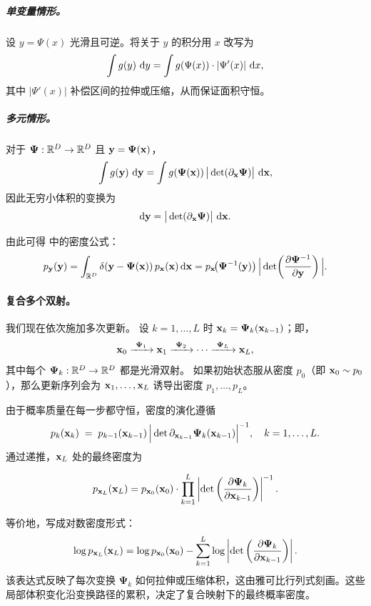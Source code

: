 \subparagraph{单变量情形。}
设 $y = \Psi(x)$ 光滑且可逆。将关于 $y$ 的积分用 $x$ 改写为
\[
\int g(y)\,\mathop{}\!\mathrm{d} y = \int g(\Psi(x)) \cdot |\Psi'(x)|\,\mathop{}\!\mathrm{d} x,
\]
其中 $|\Psi'(x)|$ 补偿区间的拉伸或压缩，从而保证面积守恒。

\subparagraph{多元情形。}
对于 $\bm{\Psi}: \mathbb{R}^D \to \mathbb{R}^D$ 且 ${\mathbf{y}}=\bm{\Psi}({\mathbf{x}})$，
\[
\int g({\mathbf{y}})\,\mathop{}\!\mathrm{d}{\mathbf{y}}
= \int g(\bm{\Psi}({\mathbf{x}})) \,\big|\det(\partial_{\mathbf{x}} \bm{\Psi})\big| \,\mathop{}\!\mathrm{d}{\mathbf{x}},
\]
因此无穷小体积的变换为
\[
\mathop{}\!\mathrm{d} {\mathbf{y}} = \big|\det(\partial_{\mathbf{x}} \bm{\Psi})\big|\,\mathop{}\!\mathrm{d} {\mathbf{x}}.
\]

由此可得  中的密度公式：
\begin{align*}
p_{{\mathbf{y}}}({\mathbf{y}})
= \int_{\mathbb{R}^D} \delta({\mathbf{y}} - \bm{\Psi}({\mathbf{x}}))\, p_{{\mathbf{x}}}({\mathbf{x}})\mathop{}\!\mathrm{d} {\mathbf{x}} = p_{{\mathbf{x}}}\!\big(\bm{\Psi}^{-1}({\mathbf{y}})\big)\,\Big|\det\!\left(\frac{\partial \bm{\Psi}^{-1}}{\partial {\mathbf{y}}}\right)\Big|.
\end{align*}



\paragraph{复合多个双射。} 我们现在依次施加多次更新。  
设 $k=1,\dots,L$ 时 ${\mathbf{x}}_k = \bm{\Psi}_k({\mathbf{x}}_{k-1})$；即，
\[
{\mathbf{x}}_0 \xrightarrow{\ \bm{\Psi}_1\ } {\mathbf{x}}_1 \xrightarrow{\ \bm{\Psi}_2\ } \cdots
\xrightarrow{\ \bm{\Psi}_L\ } {\mathbf{x}}_L,
\]
其中每个 $\bm{\Psi}_k:\mathbb{R}^D \to \mathbb{R}^D$ 都是光滑双射。  
如果初始状态服从密度 $p_0$（即 ${\mathbf{x}}_0 \sim p_0$），那么更新序列会为 ${\mathbf{x}}_1,\dots,{\mathbf{x}}_L$ 诱导出密度 $p_1,\dots,p_L$。  

由于概率质量在每一步都守恒，密度的演化遵循
\[
p_{k}({\mathbf{x}}_k) \;=\; p_{k-1}({\mathbf{x}}_{k-1}) \,
   \Big|\det \partial_{{\mathbf{x}}_{k-1}} \bm{\Psi}_k({\mathbf{x}}_{k-1})\Big|^{-1},
   \quad k=1,\dots,L.
\]
通过递推，${\mathbf{x}}_L$ 处的最终密度为
\begin{mdframed}
\begin{align}\label{eq:cov-multi-layer-nolog}
    p_{{\mathbf{x}}_L}({\mathbf{x}}_L) 
    = p_{{\mathbf{x}}_0}({\mathbf{x}}_0) 
    \cdot \prod_{k=1}^L \left| \det \left( \frac{\partial \bm{\Psi}_k}{\partial {\mathbf{x}}_{k-1}} \right) \right|^{-1}.
\end{align}
\end{mdframed}
等价地，写成对数密度形式：
\begin{align*}
    \log p_{{\mathbf{x}}_L}({\mathbf{x}}_L) 
    = \log p_{{\mathbf{x}}_0}({\mathbf{x}}_0) 
    - \sum_{k=1}^L \log \left| \det \left( \frac{\partial \bm{\Psi}_k}{\partial {\mathbf{x}}_{k-1}} \right) \right|.
\end{align*}
该表达式反映了每次变换 $\bm{\Psi}_k$ 如何拉伸或压缩体积，这由雅可比行列式刻画。这些局部体积变化沿变换路径的累积，决定了复合映射下的最终概率密度。

